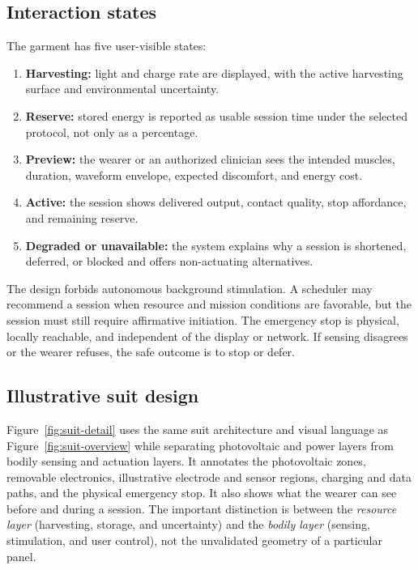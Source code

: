 \documentclass[runningheads]{llncs}
\begin{document}
\subsection{Interaction states}

The garment has five user-visible states:

\begin{enumerate}
\item \textbf{Harvesting:} light and charge rate are displayed, with the active harvesting surface and environmental uncertainty.
\item \textbf{Reserve:} stored energy is reported as usable session time under the selected protocol, not only as a percentage.
\item \textbf{Preview:} the wearer or an authorized clinician sees the intended muscles, duration, waveform envelope, expected discomfort, and energy cost.
\item \textbf{Active:} the session shows delivered output, contact quality, stop affordance, and remaining reserve.
\item \textbf{Degraded or unavailable:} the system explains why a session is shortened, deferred, or blocked and offers non-actuating alternatives.
\end{enumerate}

The design forbids autonomous background stimulation. A scheduler may recommend a session when resource and mission conditions are favorable, but the session must still require affirmative initiation. The emergency stop is physical, locally reachable, and independent of the display or network. If sensing disagrees or the wearer refuses, the safe outcome is to stop or defer.

\subsection{Illustrative suit design}

Figure~\ref{fig:suit-detail} uses the same suit architecture and visual language as Figure~\ref{fig:suit-overview} while separating photovoltaic and power layers from bodily sensing and actuation layers. It annotates the photovoltaic zones, removable electronics, illustrative electrode and sensor regions, charging and data paths, and the physical emergency stop. It also shows what the wearer can see before and during a session. The important distinction is between the \emph{resource layer} (harvesting, storage, and uncertainty) and the \emph{bodily layer} (sensing, stimulation, and user control), not the unvalidated geometry of a particular panel.
\end{document}
